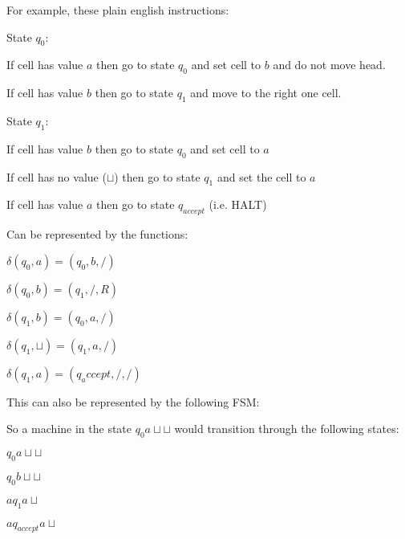\documentclass{article}
\begin{document}
\begin{multicols}{2}
    

For example, these plain english instructions:

State $q_0$:

If cell has value $a$ then go to state $q_0$ and set cell to $b$ and do not move head.

If cell has value $b$ then go to state $q_1$ and move to the right one cell.

State $q_1$:

If cell has value $b$ then go to state $q_0$ and set cell to $a$

If cell has no value ($\sqcup$) then go to state $q_1$ and set the cell to $a$

If cell has value $a$ then go to state $q_{accept}$ (i.e. HALT)

\columnbreak

Can be represented by the functions:


$\delta(q_0, a)  = (q_0, b, /)$

$\delta(q_0, b)  = (q_1, /, R)$

$\delta(q_1, b)  = (q_0, a, /)$

$\delta(q_1, \sqcup)  = (q_1, a, /)$

$\delta(q_1, a)  = (q_accept, /, /)$

\end{multicols}

This can also be represented by the following FSM:

\begin{multicols}{2}
    


\columnbreak

So a machine in the state $q_0 a \sqcup\sqcup$ would transition through the following states:

$q_0 a \sqcup\sqcup$

$q_0 b \sqcup\sqcup$

$a q_1 a\sqcup$

$a q_{accept} a\sqcup$

\end{multicols}
\end{document}
